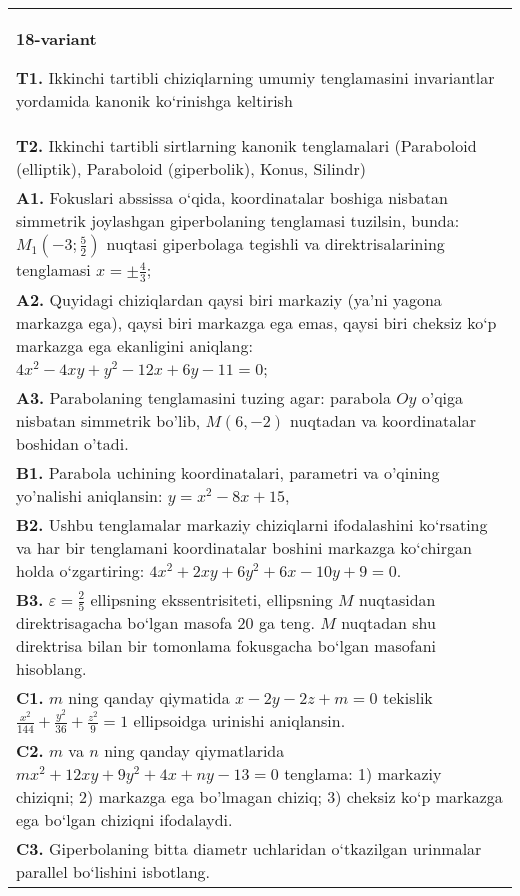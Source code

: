\documentclass{article}
\begin{document}
\begin{tabular}{m{17cm}}
\textbf{18-variant}
\newline

\textbf{T1.} Ikkinchi tartibli chiziqlarning umumiy tenglamasini invariantlar yordamida kanonik ko‘rinishga keltirish \\
\textbf{T2.} Ikkinchi tartibli sirtlarning kanonik tenglamalari (Paraboloid (elliptik), Paraboloid (giperbolik), Konus, Silindr) \\
\textbf{A1.} Fokuslari abssissa o‘qida, koordinatalar boshiga nisbatan simmetrik joylashgan giperbolaning tenglamasi tuzilsin, bunda: $M_1\left(-3 ; \frac{5}{2}\right)$ nuqtasi giperbolaga tegishli va direktrisalarining tenglamasi $x= \pm \frac{4}{3}$; \\
\textbf{A2.} Quyidagi chiziqlardan qaysi biri markaziy (ya’ni yagona markazga ega), qaysi biri markazga ega emas, qaysi biri cheksiz ko‘p markazga ega ekanligini aniqlang: $4 x^2-4 x y+y^2-12 x+6 y-11=0$; \\
\textbf{A3.} Parabolaning tenglamasini tuzing agar: parabola $O y$ o'qiga nisbatan simmetrik bo'lib, $M(6,-2)$ nuqtadan va koordinatalar boshidan o'tadi. \\
\textbf{B1.} Parabola uchining koordinatalari, parametri va o'qining yo'nalishi aniqlansin: $y=x^2-8 x+15$, \\
\textbf{B2.} Ushbu tenglamalar markaziy chiziqlarni ifodalashini ko‘rsating va har bir tenglamani koordinatalar boshini markazga ko‘chirgan holda o‘zgartiring: $4 x^2+2 x y+6 y^2+6 x-10 y+9=0$. \\
\textbf{B3.} $\varepsilon=\frac{2}{5}$ ellipsning ekssentrisiteti, ellipsning $M$ nuqtasidan direktrisagacha bo‘lgan masofa 20 ga teng. $M$ nuqtadan shu direktrisa bilan bir tomonlama fokusgacha bo‘lgan masofani hisoblang. \\
\textbf{C1.} $m$ ning qanday qiymatida $x-2 y-2 z+m=0$ tekislik $\frac{x^2}{144}+\frac{y^2}{36}+\frac{z^2}{9}=1$ ellipsoidga urinishi aniqlansin. \\
\textbf{C2.} $m$ va $n$ ning qanday qiymatlarida $m x^2+12 x y+9 y^2+4 x+n y-13=0$ tenglama: 1) markaziy chiziqni; 2) markazga ega bo'lmagan chiziq; 3) cheksiz ko‘p markazga ega bo‘lgan chiziqni ifodalaydi. \\
\textbf{C3.} Giperbolaning bitta diametr uchlaridan o‘tkazilgan urinmalar parallel bo‘lishini isbotlang. \\

\end{tabular}
\vspace{1cm}
\end{document}
